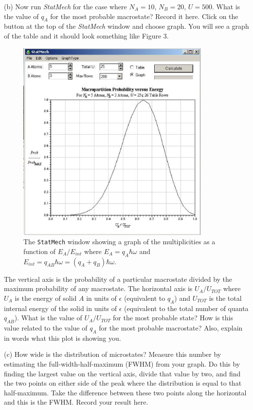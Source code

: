(b) Now run {\it StatMech} for the case where $N_A = 10$, $N_B=20$, $U = 500$.
What is the value of $q_A$ for the most probable macrostate? 
Record it here.
Click on the button at the top of the {\it StatMech} window and choose graph.
You will see a graph of the table  and it should look something like
Figure 3.
\begin{figure}[h!]
\begin{center}
\includegraphics[height=4.0in]{EinsteinSolid/statmech2.eps}
\caption{The {\tt StatMech} window showing a graph of the multiplicities as a function
of $E_A/E_{int}$ where $E_A = q_A \hbar \omega$ and 
$E_{int} = q_{AB} \hbar \omega = (q_A+q_B)\hbar \omega$.}
\end{center}
\end{figure}
The vertical axis is the probability of a particular macrostate divided by the maximum
probability of any macrostate.
The horizontal axis is  $U_A/U_{TOT}$ where 
$U_A$ is the energy of solid $A$ in units of $\epsilon$ (equivalent to $q_A$) and $U_{TOT}$ is the total
internal energy of the solid in units of $\epsilon$ (equivalent 
to the total number of quanta $q_{AB}$).
What is the value of $U_A/U_{TOT}$ for the most probable state?
How is this value related to the value of $q_A$ for the most probable macrostate? 
Also, explain in words what this plot is showing you.
\vspace{25mm}

(c) How wide is the distribution of microstates?
Measure this number by estimating the full-width-half-maximum (FWHM) from your graph.
Do this by finding the largest value on the vertical axis, divide that value by two, and find
the two points on either side of the peak where the distribution is equal to that
half-maximum.
Take the difference between these two points along the horizontal and this is the FWHM.
Record your result here.
\vspace{15mm}

